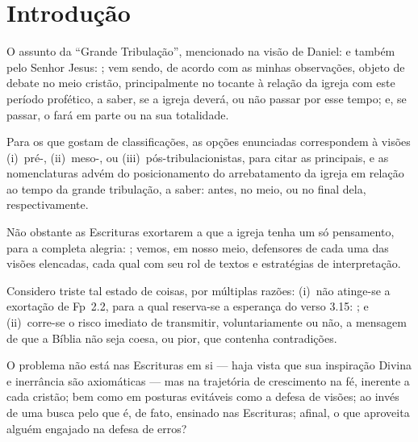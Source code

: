 \section{Introdução}

    O assunto da ``Grande Tribulação'', mencionado na visão de Daniel:  e também pelo  Senhor  Jesus:  ; vem sendo, de acordo com as minhas observações, objeto de debate no meio cristão, principalmente no
    tocante à relação da igreja com este período profético, a saber, se a igreja deverá, ou não passar por  esse  tempo;  e,  se
    passar, o fará em parte ou na sua totalidade.

    Para  os  que  gostam  de  classificações,  as  opções  enunciadas  correspondem   à   visões   (i)~pré-,   (ii)~meso-,   ou
    (iii)~pós-tribulacionistas, para citar as principais, e as nomenclaturas advém do posicionamento do arrebatamento da  igreja
    em relação ao tempo da grande tribulação, a saber: antes, no meio, ou no final dela, respectivamente.

    Não obstante as Escrituras exortarem a que a igreja tenha um só pensamento, para a completa alegria: ; vemos, em nosso meio, defensores de cada uma das visões elencadas,  cada  qual  com  seu  rol  de
    textos e estratégias de interpretação.

    Considero triste tal estado de coisas, por múltiplas razões: (i)~não atinge-se a exortação de Fp~2.2, para a qual reserva-se
    a esperança do verso 3.15: ; e (ii)~corre-se o  risco  imediato  de
    transmitir, voluntariamente ou não, a mensagem de que a Bíblia não seja coesa, ou pior, que contenha contradições.

    O problema não está nas Escrituras em si --- haja vista que sua inspiração Divina e inerrância são axiomáticas  ---  mas  na
    trajetória de crescimento na fé, inerente a cada cristão; bem como em posturas evitáveis como a defesa de visões;  ao  invés
    de uma busca pelo que é, de fato, ensinado nas Escrituras; afinal, o que aproveita alguém engajado na defesa de erros?


